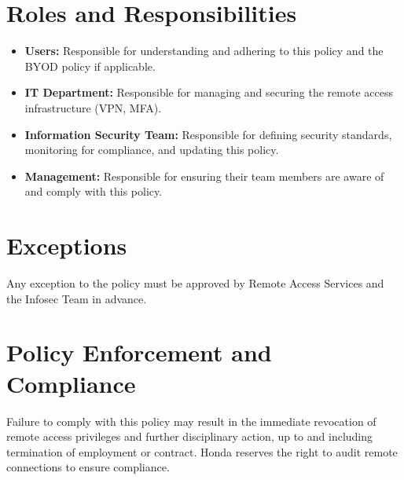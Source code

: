 \section{Roles and Responsibilities}
\begin{itemize}
    \item \textbf{Users:} Responsible for understanding and adhering to this policy and the BYOD policy if applicable.
    \item \textbf{IT Department:} Responsible for managing and securing the remote access infrastructure (VPN, MFA).
    \item \textbf{Information Security Team:} Responsible for defining security standards, monitoring for compliance, and updating this policy.
    \item \textbf{Management:} Responsible for ensuring their team members are aware of and comply with this policy.
\end{itemize}

\section{Exceptions}
Any exception to the policy must be approved by Remote Access Services and the Infosec Team in advance.

\section{Policy Enforcement and Compliance}
Failure to comply with this policy may result in the immediate revocation of remote access privileges and further disciplinary action, up to and including termination of employment or contract. Honda reserves the right to audit remote connections to ensure compliance.
